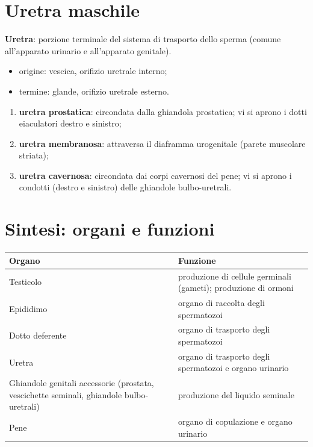 \section{Uretra maschile}

\textbf{Uretra}: porzione terminale del sistema di trasporto dello sperma (comune all'apparato
urinario e all'apparato genitale).
\begin{itemize}
  \item origine: vescica, orifizio uretrale interno;
  \item termine: glande, orifizio uretrale esterno.
\end{itemize}

\begin{enumerate}
  \item \textbf{uretra prostatica}: circondata dalla ghiandola prostatica; vi si aprono i dotti
    eiaculatori destro e sinistro;
  \item \textbf{uretra membranosa}: attraversa il diaframma urogenitale (parete muscolare striata);
  \item \textbf{uretra cavernosa}: circondata dai corpi cavernosi del pene; vi si aprono i condotti
    (destro e sinistro) delle ghiandole bulbo-uretrali.
\end{enumerate}

\section{Sintesi: organi e funzioni}

\begin{table}[htbp]
  \centering \small \renewcommand{\arraystretch}{1.3}
  \begin{tabularx}{\textwidth}{|l|X|}
    \hline
    \textbf{Organo} & \textbf{Funzione} \\
    \hline
    Testicolo & produzione di cellule germinali (gameti); produzione di ormoni \\
    \hline
    Epididimo & organo di raccolta degli spermatozoi \\
    \hline
    Dotto deferente & organo di trasporto degli spermatozoi \\
    \hline
    Uretra & organo di trasporto degli spermatozoi e organo urinario \\
    \hline
    Ghiandole genitali accessorie (prostata, vescichette seminali, ghiandole bulbo-uretrali)
      & produzione del liquido seminale \\
    \hline
    Pene & organo di copulazione e organo urinario \\
    \hline
  \end{tabularx}
\end{table}
